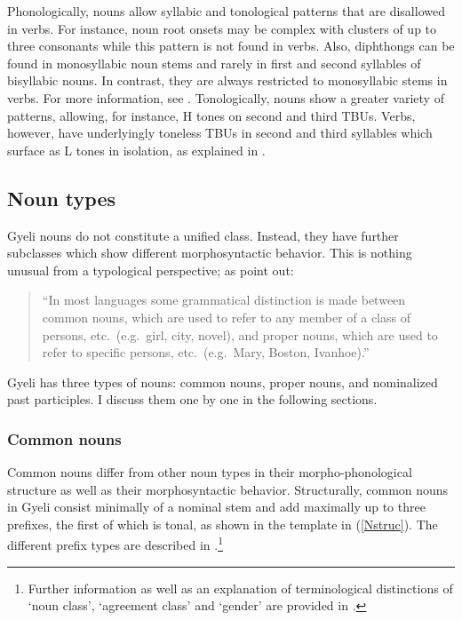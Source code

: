 Phonologically, nouns allow syllabic and tonological patterns that are disallowed in verbs. For instance, noun root onsets may be complex with clusters of up to three consonants while this pattern is not found in verbs. Also, diphthongs can be found in monosyllabic noun stems and rarely in first and second syllables of bisyllabic nouns. In contrast, they are always restricted to monosyllabic stems in verbs. For more information, see .  
Tonologically, nouns show a greater variety of patterns, allowing, for instance, H tones on second and third TBUs. Verbs, however, have underlyingly toneless TBUs in second and third syllables which surface as L tones in isolation, as explained in .


\subsection{Noun types}
\label{sec:Ntyp}

Gyeli nouns do not constitute a unified class. Instead, they have further subclasses which show different morphosyntactic behavior. This is nothing unusual from a typological perspective; as \citet[8]{schachter2007} point out:
\begin{quote} ``In most languages some grammatical distinction is made between common nouns, which are used to refer to any member of a class of persons, etc.\ (e.g.\ girl, city, novel), and proper nouns, which are used to refer to specific persons, etc.\ (e.g.\ Mary, Boston, Ivanhoe).'' \end{quote}

\noindent Gyeli has three types of nouns: common nouns, proper nouns, and nominalized past participles. I discuss them one by one in the following sections.





\subsubsection{Common nouns}
\label{sec:commonN}

Common nouns differ from other noun types  in their morpho-phonological structure as well as their morphosyntactic behavior.
Structurally, common nouns in Gyeli consist minimally of a nominal stem and add maximally up to three prefixes, the first of which is tonal, as shown in the template in (\ref{Nstruc}). The different prefix types are described in .\footnote{Further information as well as an explanation of terminological distinctions of `noun class', `agreement class' and `gender' are provided in .}

